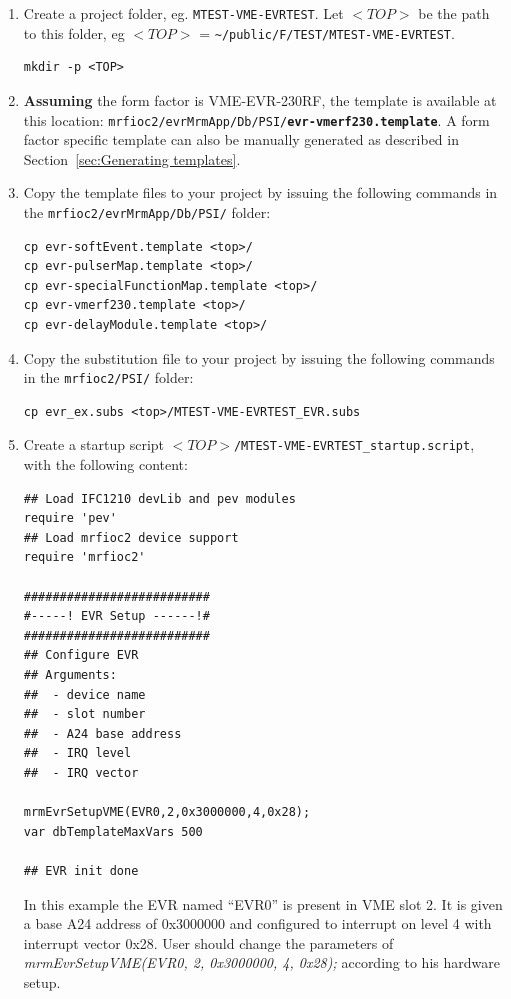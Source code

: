 \documentclass[12pt,a4paper]{article}
\begin{document}
\begin{enumerate}
\item
  Create a project folder, eg. \texttt{MTEST-VME-EVRTEST}. Let $ <TOP> $ be the path to this folder, eg $ <TOP> $ = \texttt{\textasciitilde/public/F/TEST/MTEST-VME-EVRTEST}.
\begin{verbatim}
mkdir -p <TOP>
\end{verbatim}
  
\item
  \textbf{Assuming} the form factor is VME-EVR-230RF, the template is available at this location: \texttt{mrfioc2/evrMrmApp/Db/PSI/\textbf{evr-vmerf230.template}}. A form factor specific template can also be manually generated as described in Section~\ref{sec:Generating templates}.  

\item
  Copy the template files to your project by issuing the following commands in the \texttt{mrfioc2/evrMrmApp/Db/PSI/} folder:
\begin{verbatim}
cp evr-softEvent.template <top>/
cp evr-pulserMap.template <top>/
cp evr-specialFunctionMap.template <top>/
cp evr-vmerf230.template <top>/
cp evr-delayModule.template <top>/
\end{verbatim}

\item 
  Copy the substitution file to your project by issuing the following commands in the \texttt{mrfioc2/PSI/} folder:
\begin{verbatim}
cp evr_ex.subs <top>/MTEST-VME-EVRTEST_EVR.subs
\end{verbatim}

\item
  Create a startup script
  \texttt{$<TOP>$/MTEST-VME-EVRTEST\_startup.script}, with the following content:

\begin{verbatim}
## Load IFC1210 devLib and pev modules
require 'pev'
## Load mrfioc2 device support
require 'mrfioc2'

##########################
#-----! EVR Setup ------!#
##########################
## Configure EVR
## Arguments:
##  - device name
##  - slot number
##  - A24 base address
##  - IRQ level
##  - IRQ vector

mrmEvrSetupVME(EVR0,2,0x3000000,4,0x28);
var dbTemplateMaxVars 500

## EVR init done
\end{verbatim}

  In this example the EVR named ``EVR0'' is present in VME slot 2. It is
  given a base A24 address of 0x3000000 and configured to interrupt on
  level 4 with interrupt vector 0x28. User should change the parameters of \emph{mrmEvrSetupVME(EVR0, 2, 0x3000000, 4, 0x28);} according to his hardware setup.
  

\end{enumerate}
\end{document}
